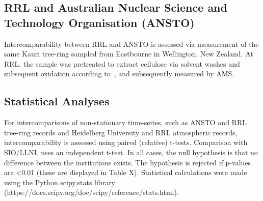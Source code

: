 \subsection{RRL and Australian Nuclear Science and Technology Organisation (ANSTO)}

Intercomparability between RRL and ANSTO is assessed via measurement of the same Kauri tree-ring sampled from Eastbourne in Wellington, New Zealand. At RRL, the sample was pretreated to extract cellulose via solvent washes and subsequent oxidation according to~\cite{hua2000bomb, norris2015reconstruction}, and subsequently measured by AMS. 

  

\subsection{Statistical Analyses}
For intercomparisons of non-stationary time-series, such as ANSTO and RRL tree-ring records and Heidelberg University and RRL atmospheric records, intercomparability is assessed using paired (relative) t-tests. Comparison with SIO/LLNL uses an independent t-test. In all cases, the null hypothesis is that no difference between the institutions exists. The hypothesis is rejected if p-values are <0.01 (these are displayed in Table X). Statistical calculations were made using the Python scipy.stats library (https://docs.scipy.org/doc/scipy/reference/stats.html).
